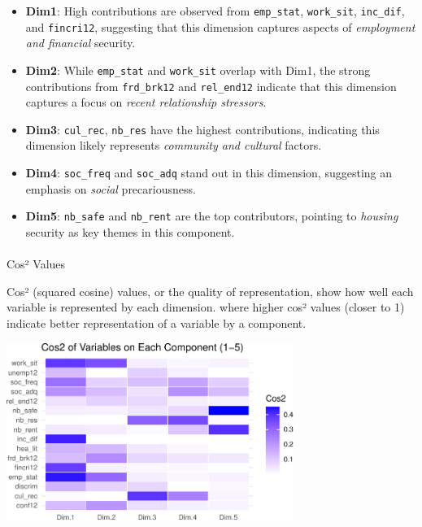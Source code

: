 \documentclass[
]{article}
\makeatletter
\let\oldparagraph\paragraph
\renewcommand{\paragraph}{
    \@ifstar
      \xxxParagraphStar
      \xxxParagraphNoStar
  }
\newcommand{\xxxParagraphStar}[1]{\oldparagraph*{#1}\mbox{}}
\newcommand{\xxxParagraphNoStar}[1]{\oldparagraph{#1}\mbox{}}
\makeatother
\begin{document}
\begin{itemize}
\item
  \textbf{Dim1}: High contributions are observed from
  \texttt{emp\_stat}, \texttt{work\_sit}, \texttt{inc\_dif}, and
  \texttt{fincri12}, suggesting that this dimension captures aspects of
  \emph{employment and financial} security.
\item
  \textbf{Dim2}: While \texttt{emp\_stat} and \texttt{work\_sit} overlap
  with Dim1, the strong contributions from \texttt{frd\_brk12} and
  \texttt{rel\_end12} indicate that this dimension captures a focus on
  \emph{recent relationship stressors}.
\item
  \textbf{Dim3}: \texttt{cul\_rec}, \texttt{nb\_res} have the highest
  contributions, indicating this dimension likely represents
  \emph{community and cultural} factors.
\item
  \textbf{Dim4}: \texttt{soc\_freq} and \texttt{soc\_adq} stand out in
  this dimension, suggesting an emphasis on \emph{social}
  precariousness.
\item
  \textbf{Dim5}: \texttt{nb\_safe} and \texttt{nb\_rent} are the top
  contributors, pointing to \emph{housing} security as key themes in
  this component.
\end{itemize}

\paragraph{Cos² Values}\label{cosuxb2-values}

Cos² (squared cosine) values, or the quality of representation, show how
well each variable is represented by each dimension. where higher cos²
values (closer to 1) indicate better representation of a variable by a
component.

\begin{center}
\includegraphics[width=0.7\textwidth,height=\textheight]{draft_v3_files/figure-pdf/unnamed-chunk-17-1.pdf}
\end{center}
\end{document}

